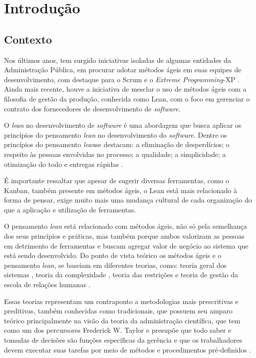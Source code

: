 
\chapter[Introdução]{Introdução}



\section[Contexto]{Contexto}

Nos últimos anos, tem surgido iniciativas isoladas de algumas entidades da Administração Pública, em procurar adotar métodos ágeis em suas equipes de desenvolvimento, com destaque para o Scrum e o \textit{Extreme Programming}-XP \cite{TCU:2013} \cite{RTMAC}.  Ainda mais recente, houve a iniciativa de mesclar o uso de métodos ágeis com a filosofia de gestão da produção, conhecida como Lean, com o foco em gerenciar o contrato dos fornecedores de desenvolvimento de \textit{software}. 

O \textit{lean} no desenvolvimento de \textit{software} é uma abordagem que busca aplicar os princípios do pensamento \textit{lean} no desenvolvimento do \textit{software}. Dentre os princípios do pensamento \textit{lean}se destacam: a eliminação de desperdícios; o respeito às pessoas envolvidas no processo; a qualidade; a simplicidade; a otimização do todo e entregas rápidas \cite{poppendieck}.

É importante ressaltar que apesar de sugerir diversas ferramentas, como o Kanban, também presente em métodos ágeis, o Lean está mais relacionado à forma de pensar, exige muito mais uma mudança cultural de cada organização do que a aplicação e utilização de ferramentas. 

O pensamento \textit{lean} está relacionado com métodos ágeis, não só pela semelhança dos seus princípios e práticas, mas também porque ambos valorizam as pessoas em detrimento de ferramentas e buscam agregar valor de negócio ao sistema que está sendo desenvolvido. Do ponto de vista teórico os métodos ágeis e o pensamento \textit{lean}, se baseiam em diferentes teorias, como: teoria geral dos sistemas \cite{sistemas}, teoria da complexidade \cite{complexidade}, teoria das restrições \cite{katayama2010} e teoria de gestão da escola de relações humanas \cite{administracao}. 

Essas teorias representam um contraponto a metodologias mais prescritivas e preditivas, também conhecidas como tradicionais, que possuem seu amparo teórico principalmente na visão da teoria da administração científica, que tem como um dos percursores Frederick W. Taylor e presupõe que todo saber e tomadas de decisões são funções específicas da gerência e que os trabalhadores devem executar suas tarefas por meio de métodos e procedimentos pré-definidos \cite{administracao}.

